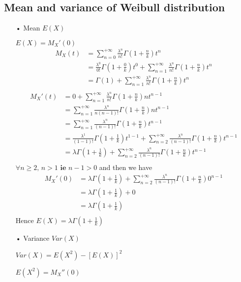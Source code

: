 \documentclass[11pt]{article}
\def\gt{>}
\begin{document}
\subsection{Mean and variance of Weibull distribution}

\begin{itemize}
\item[•]Mean $E(X)$


$E(X)=M_X'(0)$
\begin{align*}
M_X(t)  
        &=\sum_{n=0}^{+\infty} \frac{{\lambda }^n}{n!} \Gamma(1+\frac{n}{k}) t^n \\
        &=\frac{{\lambda }^0}{0!} \Gamma(1+\frac{0}{k}) t^0+\sum_{n=1}^{+\infty} \frac{{\lambda }^n}{n!} \Gamma(1+\frac{n}{k}) t^n \\
         &= \Gamma(1) +\sum_{n=1}^{+\infty} \frac{{\lambda }^n}{n!} \Gamma(1+\frac{n}{k}) t^n \\
\end{align*}
\begin{align*}
M_X'(t)  
        &=0+\sum_{n=1}^{+\infty} \frac{{\lambda }^n}{n!} \Gamma(1+\frac{n}{k}) nt^{n-1} \\
         &=\sum_{n=1}^{+\infty} \frac{{\lambda }^n}{n(n-1)!} \Gamma(1+\frac{n}{k}) nt^{n-1} \\
         &=\sum_{n=1}^{+\infty} \frac{{\lambda }^n}{(n-1)!} \Gamma(1+\frac{n}{k})t^{n-1} \\
         &=\frac{{\lambda }^1}{(1-1)!} \Gamma(1+\frac{1}{k})t^{1-1}+\sum_{n=2}^{+\infty} \frac{{\lambda }^n}{(n-1)!} \Gamma(1+\frac{n}{k})t^{n-1} \\
         &=\lambda \Gamma(1+\frac{1}{k})+\sum_{n=2}^{+\infty} \frac{{\lambda }^n}{(n-1)!} \Gamma(1+\frac{n}{k})t^{n-1} \\
\end{align*}
$\forall n \geq 2 \textbf{, } n\gt 1 \textbf{ ie }  n-1 \gt 0$ and then we have
\begin{align*}
M_X'(0)  
         &=\lambda \Gamma(1+\frac{1}{k})+\sum_{n=2}^{+\infty} \frac{{\lambda }^n}{(n-1)!} \Gamma(1+\frac{n}{k})0^{n-1} \\
         &=\lambda \Gamma(1+\frac{1}{k})+0 \\
         &=\lambda \Gamma(1+\frac{1}{k}) \\
\end{align*}
Hence $E(X)=\lambda \Gamma(1+\frac{1}{k})$

\item[•]Variance $Var(X)$

$Var(X)=E(X^2)-[E(X)]^2$

$E(X^2)=M_X''(0)$
\end{itemize}
\end{document}
